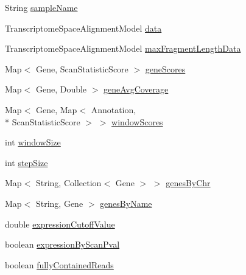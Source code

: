 \begin{DoxyCompactItemize}
\item 
String \hyperlink{classbroad_1_1pda_1_1seq_1_1protection_1_1_sample_data_a5b0011ca04c2ee52ec32f8508b82ae99}{sample\+Name}
\item 
Transcriptome\+Space\+Alignment\+Model \hyperlink{classbroad_1_1pda_1_1seq_1_1protection_1_1_sample_data_ae06d8e63d6ddf7093085beba12b22e8a}{data}
\item 
Transcriptome\+Space\+Alignment\+Model \hyperlink{classbroad_1_1pda_1_1seq_1_1protection_1_1_sample_data_a214cced67761f0090ba326708620d3be}{max\+Fragment\+Length\+Data}
\item 
Map$<$ Gene, Scan\+Statistic\+Score $>$ \hyperlink{classbroad_1_1pda_1_1seq_1_1protection_1_1_sample_data_af611a295e308f4f0d0849a80139ad7ff}{gene\+Scores}
\item 
Map$<$ Gene, Double $>$ \hyperlink{classbroad_1_1pda_1_1seq_1_1protection_1_1_sample_data_ad517adb3cfab02f8f65bc10818ebca71}{gene\+Avg\+Coverage}
\item 
Map$<$ Gene, Map$<$ Annotation, \\*
Scan\+Statistic\+Score $>$ $>$ \hyperlink{classbroad_1_1pda_1_1seq_1_1protection_1_1_sample_data_a6a53d104b93427859b6fd2c4ffbfdf6d}{window\+Scores}
\item 
int \hyperlink{classbroad_1_1pda_1_1seq_1_1protection_1_1_sample_data_af155a04e70a9feafd812aa6135f5b732}{window\+Size}
\item 
int \hyperlink{classbroad_1_1pda_1_1seq_1_1protection_1_1_sample_data_ab5fe21e8281091d1be8de525e17d8a3a}{step\+Size}
\item 
Map$<$ String, Collection$<$ Gene $>$ $>$ \hyperlink{classbroad_1_1pda_1_1seq_1_1protection_1_1_sample_data_a8b1f58470538adcd26f47252bdf94232}{genes\+By\+Chr}
\item 
Map$<$ String, Gene $>$ \hyperlink{classbroad_1_1pda_1_1seq_1_1protection_1_1_sample_data_a528cf3b7c628a3f4a567bd33ba75ca0f}{genes\+By\+Name}
\item 
double \hyperlink{classbroad_1_1pda_1_1seq_1_1protection_1_1_sample_data_ae1a282e95f82d5974d5e3c4189a81f8c}{expression\+Cutoff\+Value}
\item 
boolean \hyperlink{classbroad_1_1pda_1_1seq_1_1protection_1_1_sample_data_a0f463fa018b0f1cc4495a3dfdd2e9ef5}{expression\+By\+Scan\+Pval}
\item 
boolean \hyperlink{classbroad_1_1pda_1_1seq_1_1protection_1_1_sample_data_ac971b6d1585808b15cc2ef8807225bf3}{fully\+Contained\+Reads}
\end{DoxyCompactItemize}
